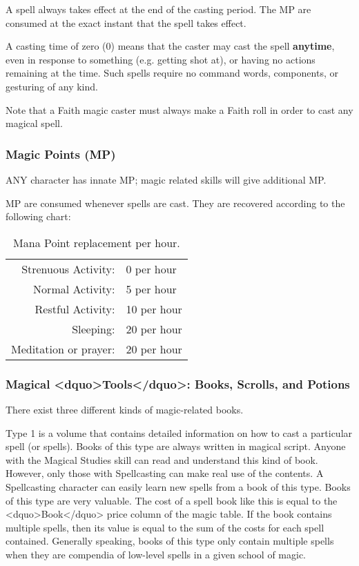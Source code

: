 A spell always takes effect at the end of the casting period.  The MP
are consumed at the exact instant that the spell takes effect.

A casting time of zero (0) means that the caster may cast the spell
\textbf{anytime}, even in response to something (e.g. getting shot
at), or having no actions remaining at the time.  Such spells require
no command words, components, or gesturing of any kind.

Note that a Faith magic caster must always make a Faith roll in order
to cast any magical spell.

\subsubsection{Magic Points (MP)}

ANY character has innate MP; magic related skills will give additional MP.

MP are consumed whenever spells are cast.  They are recovered
according to the following chart:

\begin{table}[htb]
\begin{center}
\begin{tabular}{rl}
Strenuous Activity: & 0 per hour \\
Normal Activity: & 5 per hour \\
Restful Activity: & 10 per hour \\
Sleeping: & 20 per hour \\
Meditation or prayer: & 20 per hour \\
\end{tabular}
\caption{Mana Point replacement per hour.}
\end{center}
\end{table}

\subsubsection{Magical <dquo>Tools</dquo>: Books, Scrolls, and Potions}

There exist three different kinds of magic-related books.

Type 1 is a volume that contains detailed information on how to cast a
particular spell (or spells).  Books of this type are always written
in magical script.  Anyone with the Magical Studies skill can read and
understand this kind of book.  However, only those with Spellcasting
can make real use of the contents.  A Spellcasting character can
easily learn new spells from a book of this type.  Books of this type
are very valuable.  The cost of a spell book like this is equal to the
<dquo>Book</dquo> price column of the magic table.  If the book contains
multiple spells, then its value is equal to the sum of the costs for
each spell contained.  Generally speaking, books of this type only
contain multiple spells when they are compendia of low-level spells in
a given school of magic.

